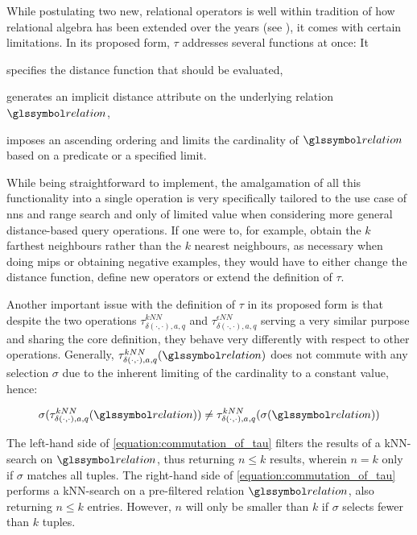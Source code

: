 While postulating two new, relational operators is well within tradition of how relational algebra has been extended over the years (see ), it comes with certain limitations. In its proposed form, $\tau$ addresses several functions at once: It
\begin{enumerate*}[label=(\roman*)]
    \item specifies the distance function that should be evaluated,
    \item generates an implicit distance attribute on the underlying relation $\relation$,
    \item imposes an ascending ordering and limits the cardinality of $\relation$ based on a predicate or a specified limit.
\end{enumerate*}

While being straightforward to implement, the amalgamation of all this functionality into a single operation is very specifically tailored to the use case of \acrshort{nns} and range search and only of limited value when considering more general distance-based query operations. If one were to, for example, obtain the $k$ farthest neighbours rather than the $k$ nearest neighbours, as necessary when doing \acrshort{mips} or obtaining negative examples, they would have to either change the distance function, define new operators or extend the definition of $\tau$. 

Another important issue with the definition of $\tau$ in its proposed form is that despite the two operations $\tau^{kNN}_{\delta(\cdot,\cdot),a,q}$ and $\tau^{\epsilon NN}_{\delta(\cdot,\cdot),a,q}$ serving a very similar purpose and sharing the core definition, they behave very differently with respect to other operations. Generally, $\tau^{kNN}_{\delta(\cdot,\cdot),a,q}(\relation)$ does not commute with any selection $\sigma$ due to the inherent limiting of the cardinality to a constant value, hence:

\begin{equation}
    \label{equation:commutation_of_tau}
    \sigma(\tau^{kNN}_{\delta(\cdot,\cdot),a,q}(\relation)) \neq \tau^{kNN}_{\delta(\cdot,\cdot),a,q}(\sigma(\relation))
\end{equation}

The left-hand side of \cref{equation:commutation_of_tau} filters the results of a kNN-search on $\relation$, thus returning $n \leq k$ results, wherein $n = k$ only if $\sigma$ matches all tuples. The right-hand side of \cref{equation:commutation_of_tau} performs a kNN-search on a pre-filtered relation $\relation$, also returning $n \leq k$ entries. However, $n$ will only be smaller than $k$ if $\sigma$ selects fewer than $k$ tuples.